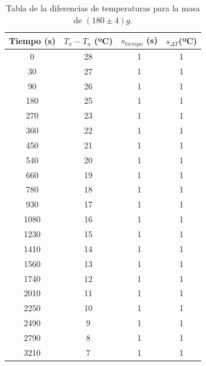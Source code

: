 \documentclass[a4paper]{article}
\begin{document}
\begin{table}[H]
  \centering
    \begin{tabular}{|c|c|c|c|} \hline
    Tiempo (s) & $T_x - T_a$ (ºC) & $s_{tiempo }$ (s) &  $s_{ \Delta T} $(ºC) \\ \hline
    0     & 28    & 1     & 1 \\ \hline
    30    & 27    & 1     & 1 \\ \hline
    90    & 26    & 1     & 1 \\ \hline
    180   & 25    & 1     & 1 \\ \hline
    270   & 23    & 1     & 1 \\ \hline
    360   & 22    & 1     & 1 \\ \hline
    450   & 21    & 1     & 1 \\ \hline
    540   & 20    & 1     & 1 \\ \hline
    660   & 19    & 1     & 1 \\ \hline
    780   & 18    & 1     & 1 \\ \hline
    930   & 17    & 1     & 1 \\ \hline
    1080  & 16    & 1     & 1 \\ \hline
    1230  & 15    & 1     & 1 \\ \hline
    1410  & 14    & 1     & 1 \\ \hline
    1560  & 13    & 1     & 1 \\ \hline
    1740  & 12    & 1     & 1 \\ \hline
    2010  & 11    & 1     & 1 \\ \hline
    2250  & 10    & 1     & 1 \\ \hline
    2490  & 9     & 1     & 1 \\ \hline
    2790  & 8     & 1     & 1 \\ \hline
    3210  & 7     & 1     & 1 \\ \hline
    \end{tabular}%
  \caption{Tabla de la diferencias de temperaturas para la masa de $(180\pm 4)g$.}
\end{table}%
\end{document}
